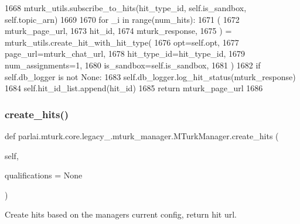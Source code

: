 \begin{DoxyCode}
1668             mturk\_utils.subscribe\_to\_hits(hit\_type\_id, self.is\_sandbox, self.topic\_arn)
1669 
1670         \textcolor{keywordflow}{for} \_i \textcolor{keywordflow}{in} range(num\_hits):
1671             (
1672                 mturk\_page\_url,
1673                 hit\_id,
1674                 mturk\_response,
1675             ) = mturk\_utils.create\_hit\_with\_hit\_type(
1676                 opt=self.opt,
1677                 page\_url=mturk\_chat\_url,
1678                 hit\_type\_id=hit\_type\_id,
1679                 num\_assignments=1,
1680                 is\_sandbox=self.is\_sandbox,
1681             )
1682             \textcolor{keywordflow}{if} self.db\_logger \textcolor{keywordflow}{is} \textcolor{keywordflow}{not} \textcolor{keywordtype}{None}:
1683                 self.db\_logger.log\_hit\_status(mturk\_response)
1684             self.hit\_id\_list.append(hit\_id)
1685         \textcolor{keywordflow}{return} mturk\_page\_url
1686 
\end{DoxyCode}
\mbox{\label{classparlai_1_1mturk_1_1core_1_1legacy__2018_1_1mturk__manager_1_1MTurkManager_a01873b0b39427a6762cbe444b87fbf4b}} 
\subsubsection{\texorpdfstring{create\+\_\+hits()}{create\_hits()}}
{\footnotesize\ttfamily def parlai.\+mturk.\+core.\+legacy\+\_.\+mturk\+\_\+manager.\+M\+Turk\+Manager.\+create\+\_\+hits (\begin{DoxyParamCaption}\item[{}]{self,  }\item[{}]{qualifications = {\ttfamily None} }\end{DoxyParamCaption})}

\begin{DoxyVerb}Create hits based on the managers current config, return hit url.
\end{DoxyVerb}
 

